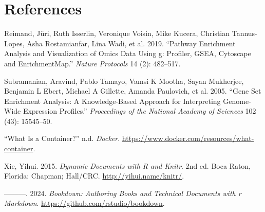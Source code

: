 \documentclass[
]{book}
\newlength{\cslhangindent}
\newenvironment{CSLReferences}[2] %
 {\begin{list}{}{%
  \setlength{\itemindent}{0pt}
  \setlength{\leftmargin}{0pt}
  \setlength{\parsep}{0pt}
  \ifodd #1
   \setlength{\leftmargin}{\cslhangindent}
   \setlength{\itemindent}{-1\cslhangindent}
  \fi
  \setlength{\itemsep}{#2\baselineskip}}}
 {\end{list}}
\begin{document}
\chapter{References}\label{references}

\label{refs}
\begin{CSLReferences}{1}{0}
Reimand, Jüri, Ruth Isserlin, Veronique Voisin, Mike Kucera, Christian Tannus-Lopes, Asha Rostamianfar, Lina Wadi, et al. 2019. {``Pathway Enrichment Analysis and Visualization of Omics Data Using g: Profiler, GSEA, Cytoscape and EnrichmentMap.''} \emph{Nature Protocols} 14 (2): 482--517.

Subramanian, Aravind, Pablo Tamayo, Vamsi K Mootha, Sayan Mukherjee, Benjamin L Ebert, Michael A Gillette, Amanda Paulovich, et al. 2005. {``Gene Set Enrichment Analysis: A Knowledge-Based Approach for Interpreting Genome-Wide Expression Profiles.''} \emph{Proceedings of the National Academy of Sciences} 102 (43): 15545--50.

{``What Is a Container?''} n.d. \emph{Docker}. \url{https://www.docker.com/resources/what-container}.

Xie, Yihui. 2015. \emph{Dynamic Documents with {R} and Knitr}. 2nd ed. Boca Raton, Florida: Chapman; Hall/CRC. \url{http://yihui.name/knitr/}.

---------. 2024. \emph{Bookdown: Authoring Books and Technical Documents with r Markdown}. \url{https://github.com/rstudio/bookdown}.

\end{CSLReferences}
\end{document}
